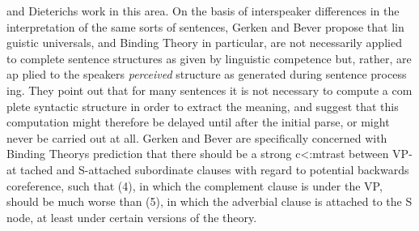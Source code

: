 \clearpage\setcounter{page}{1}\begin{styleTextbody}
and Dieterich{\textquotesingle}s work in this area. On the basis of interspeaker differences in the interpretation of the same sorts of sentences, Gerken and Bever propose that lin\- guistic universals, and Binding Theory in particular, are not necessarily applied to complete sentence structures as given by linguistic competence but, rather, are ap\- plied to the speaker{\textquotesingle}s \textit{perceived}\textit{ }structure as generated during sentence process\- ing. They point out that for many sentences it is not necessary to compute a com\- plete syntactic structure in order to extract the meaning, and suggest that this computation might therefore be delayed until after the initial parse, or might never be carried out at all. Gerken and Bever are specifically concerned with Binding Theory{\textquotesingle}s prediction that there should be a strong c{\textless}:mtrast between VP-at\- tached and S-attached subordinate clauses with regard to potential backwards coreference, such that (4), in which the complement clause is under the VP, should be much worse than (5), in which the adverbial clause is attached to the S node, at least under certain versions of the theory.
\end{styleTextbody}


